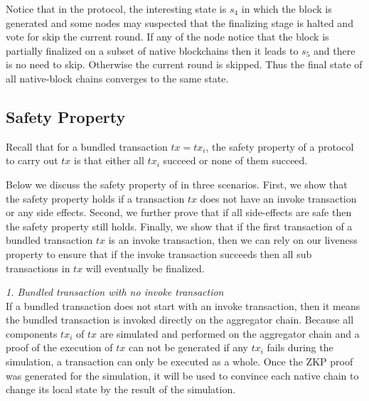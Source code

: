 
Notice that in the protocol, the interesting state is $s_4$ in which the block is generated and some nodes may suspected that the finalizing stage is halted and vote for skip the current round. If any of the node notice that the block is partially finalized on a subset of native blockchains then it leads to $s_5$ and there is no need to skip. Otherwise the current round is skipped. Thus the final state of all native-block chains converges to the same state.

\subsection{Safety Property}
Recall that for a bundled transaction $tx = {tx_i}$, the safety property of a protocol to carry out $tx$ is that either all $tx_i$ succeed or none of them succeed.

Below we discuss the safety property of \dprotocol in three scenarios. First, we show that the safety property holds if a transaction $tx$ does not have an invoke transaction or any side effects. Second, we further prove that if all side-effects are safe then the safety property still holds. Finally, we show that if the first transaction of a bundled transaction $tx$ is an invoke transaction, then we can rely on our liveness property to ensure that if the invoke transaction succeeds then all sub transactions in $tx$ will eventually be finalized.


\smallskip\noindent\emph{1. Bundled transaction with no invoke transaction}\\
If a bundled transaction does not start with an invoke transaction, then it means the bundled transaction is invoked directly on the aggregator chain. Because all components $tx_i$ of $tx$ are simulated and performed on the aggregator chain and a proof of the execution of $tx$ can not be generated if any $tx_i$ fails during the simulation, a transaction can only be executed as a whole. Once the ZKP proof was generated for the simulation, it will be used to convince each native chain to change its local state by the result of the simulation.

